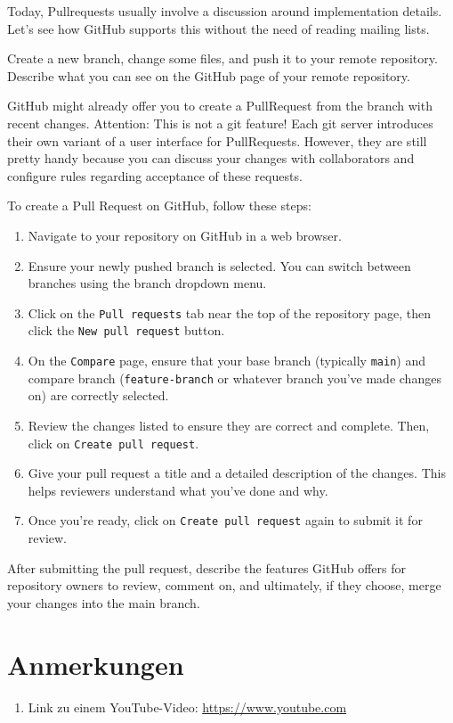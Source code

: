 \documentclass{dcbl/challenge}
\begin{document}
\begin{aufgabe}
    Today, Pullrequests usually involve a discussion around implementation details. Let's see how GitHub supports this without the need of reading mailing lists.
    
    Create a new branch, change some files, and push it to your remote repository.
    Describe what you can see on the GitHub page of your remote repository.

    GitHub might already offer you to create a PullRequest from the branch with recent changes. Attention: This is not a git feature! Each git server introduces their own variant of a user interface for PullRequests. However, they are still pretty handy because you can discuss your changes with collaborators and configure rules regarding acceptance of these requests.
    
     To create a Pull Request on GitHub, follow these steps:
    \begin{enumerate}
        \item Navigate to your repository on GitHub in a web browser.
        \item Ensure your newly pushed branch is selected. You can switch between branches using the branch dropdown menu.
        \item Click on the \texttt{Pull requests} tab near the top of the repository page, then click the \texttt{New pull request} button.
        \item On the \texttt{Compare} page, ensure that your base branch (typically \texttt{main}) and compare branch (\texttt{feature-branch} or whatever branch you've made changes on) are correctly selected.
        \item Review the changes listed to ensure they are correct and complete. Then, click on \texttt{Create pull request}.
        \item Give your pull request a title and a detailed description of the changes. This helps reviewers understand what you've done and why.
        \item Once you're ready, click on \texttt{Create pull request} again to submit it for review.
    \end{enumerate}
    
    After submitting the pull request, describe the features GitHub offers for repository owners to review, comment on, and ultimately, if they choose, merge your changes into the main branch. 
\end{aufgabe}


\section*{Anmerkungen}
\begin{enumerate}
    \item Link zu einem YouTube-Video: \url{https://www.youtube.com}
\end{enumerate}
\end{document}
